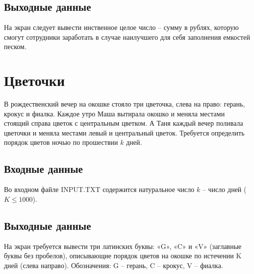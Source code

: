 \documentclass[12pt]{article}
\begin{document}
\subsection{Выходные данные}
На экран следует вывести инственное целое число – сумму в рублях, которую смогут сотрудники заработать в случае наилучшего для себя заполнения емкостей песком.


\section{Цветочки}
В рождественский вечер на окошке стояло три цветочка, слева на право: герань, крокус и фиалка. Каждое утро Маша вытирала окошко и меняла местами стоящий справа цветок с центральным цветком. А Таня каждый вечер поливала цветочки и меняла местами левый и центральный цветок. Требуется определить порядок цветов ночью по прошествии $k$ дней.


\subsection{Входные данные}
Во входном файле INPUT.TXT содержится натуральное число $k$ – число дней ($K \leq 1000$).
\subsection{Выходные данные}
На экран требуется вывести три латинских буквы: «G», «C» и «V» (заглавные буквы без пробелов), описывающие порядок цветов на окошке по истечении K дней (слева направо). Обозначения: G – герань, C – крокус, V – фиалка.
\end{document}
